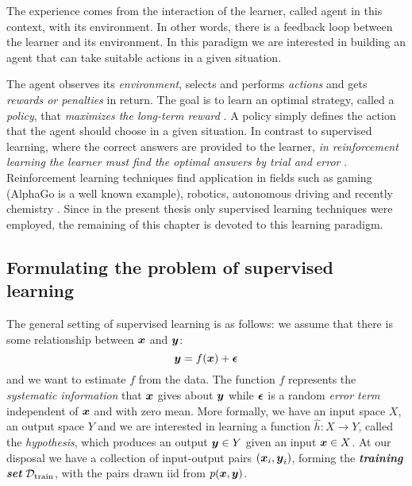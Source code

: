 \begin{definition}
	The experience comes from the interaction of the learner, called
	agent in this context, with its environment. In other words,
	there is a feedback loop between the learner and its environment. In this
	paradigm we are interested in building an agent that can take suitable
	actions in a given situation.
\end{definition}

The agent observes its \emph{environment}, selects and performs \emph{actions}
and gets \emph{rewards or penalties} in return. The goal is to learn an optimal
strategy, called a \emph{policy}, that \emph{maximizes the long-term reward}
\parencite{ml}. A policy simply defines the action that the agent should
choose in a given situation. In contrast to supervised learning, where the
correct answers are provided to the learner, \emph{in reinforcement learning the
learner must find the optimal answers by trial and error}
\parencite{bishop2007}. Reinforcement learning techniques find application in
fields such as gaming (AlphaGo is a well known example), robotics, autonomous
driving and recently chemistry \parencite{li, Gow2022}. Since in the present
thesis only supervised learning techniques were employed, the remaining of this
chapter is devoted to this learning paradigm.

\subsection{Formulating the problem of supervised learning}
\label{subsec:supervised_learning}

The general setting of supervised learning is as follows: we assume that there
is some relationship between $\boldsymbol{x}$ and $\boldsymbol{y}$:
\begin{equation}
	\label{eq:supervised}
	\boldsymbol{y} = f(\boldsymbol{x}) + \boldsymbol{\epsilon}
\end{equation}
and we want to estimate $f$ from the data. The function $f$ represents the
\emph{systematic information} that $\boldsymbol{x}$ gives about $\boldsymbol{y}$ while
$\boldsymbol{\epsilon}$ is a random \emph{error term} independent of
$\boldsymbol{x}$ and with zero mean. More formally, we have an input space $X$, an output
space $Y$ and we are interested in learning a function $\hat{h} \colon X \to Y$,
called the \emph{hypothesis}, which produces
an output $\boldsymbol{y} \in Y$ given an input $\boldsymbol{x} \in X$. At our disposal we have a
collection of input-output pairs $(\boldsymbol{x}_i, \boldsymbol{y}_i)$, forming the
\emph{\textbf{training set}} $\mathcal{D}_\text{train}$, with the pairs drawn
\acrshort{iid} from $p(\boldsymbol{x}, \boldsymbol{y})$.

